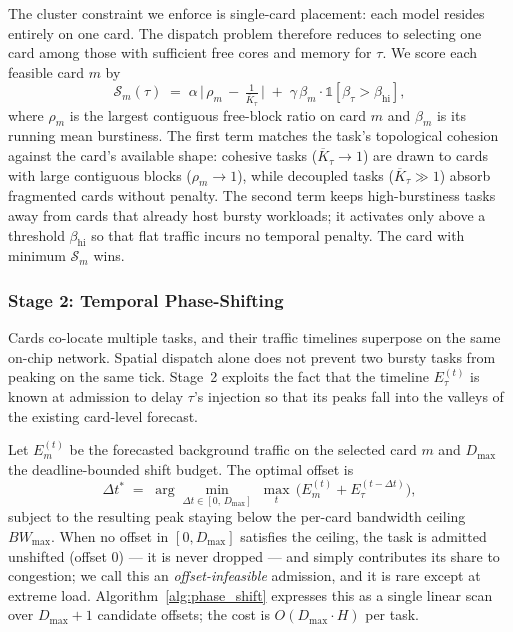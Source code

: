 \documentclass[letterpaper,twocolumn,10pt]{article}
\begin{document}
The cluster constraint we enforce is single-card placement: each model resides entirely on one card. The dispatch problem therefore reduces to selecting one card among those with sufficient free cores and memory for $\tau$. We score each feasible card $m$ by
\begin{equation}
    \mathcal{S}_m(\tau) \;=\; \alpha\,\bigl|\,\rho_m \,-\, \tfrac{1}{\overline{K}_\tau}\,\bigr| \;+\; \gamma\,\beta_m \cdot \mathbb{1}[\beta_\tau > \beta_{\text{hi}}],
    \label{eq:macro_score}
\end{equation}
where $\rho_m$ is the largest contiguous free-block ratio on card $m$ and $\beta_m$ is its running mean burstiness. The first term matches the task's topological cohesion against the card's available shape: cohesive tasks ($\overline{K}_\tau\!\to\!1$) are drawn to cards with large contiguous blocks ($\rho_m\!\to\!1$), while decoupled tasks ($\overline{K}_\tau \gg 1$) absorb fragmented cards without penalty. The second term keeps high-burstiness tasks away from cards that already host bursty workloads; it activates only above a threshold $\beta_{\text{hi}}$ so that flat traffic incurs no temporal penalty. The card with minimum $\mathcal{S}_m$ wins.

\subsubsection{Stage 2: Temporal Phase-Shifting}
\label{sec:phase_shift}

Cards co-locate multiple tasks, and their traffic timelines superpose on the same on-chip network. Spatial dispatch alone does not prevent two bursty tasks from peaking on the same tick. Stage~2 exploits the fact that the timeline $E_\tau^{(t)}$ is known at admission to delay $\tau$'s injection so that its peaks fall into the valleys of the existing card-level forecast.

Let $E_m^{(t)}$ be the forecasted background traffic on the selected card $m$ and $D_{\max}$ the deadline-bounded shift budget. The optimal offset is
\begin{equation}
    \Delta t^{*} \;=\; \arg\min_{\Delta t \in [0,\, D_{\max}]}\; \max_t\,\bigl(E_m^{(t)} + E_\tau^{(t - \Delta t)}\bigr),
    \label{eq:phase_shift}
\end{equation}
subject to the resulting peak staying below the per-card bandwidth ceiling $BW_{\max}$. When no offset in $[0, D_{\max}]$ satisfies the ceiling, the task is admitted unshifted (offset $0$) --- it is never dropped --- and simply contributes its share to congestion; we call this an \emph{offset-infeasible} admission, and it is rare except at extreme load. Algorithm~\ref{alg:phase_shift} expresses this as a single linear scan over $D_{\max}{+}1$ candidate offsets; the cost is $O(D_{\max} \cdot H)$ per task.
\end{document}
